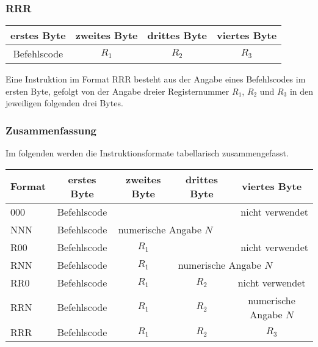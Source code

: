 \subsubsection{RRR}
\label{RRR}

\begin{center}
  \begin{tabular}{|*{4}{c|}} \hline
    erstes Byte & zweites Byte  & drittes Byte  & viertes Byte \\\hline\hline
    Befehlscode & $R_{1}$       & $R_{2}$       & $R_{3}$      \\\hline
  \end{tabular}
\end{center}

Eine Instruktion im Format RRR besteht aus der Angabe eines Befehlscodes im
ersten Byte, gefolgt von der Angabe dreier Registernummer $R_{1}$, $R_{2}$ und
$R_{3}$ in den jeweiligen folgenden drei Bytes.


\subsubsection{Zusammenfassung}
\label{subsec:Instr-Formate-Zusammenfassung}
Im folgenden werden die Instruktionsformate tabellarisch zusammengefasst.

\begin{center}
  \begin{tabular}{|l||*{4}{c|}}
    \hline
    Format & erstes Byte & zweites Byte  & drittes Byte  & viertes Byte
    \\\hline\hline
    000 & Befehlscode & \multicolumn{3}{r|}{nicht verwendet}               
\\\hline
    NNN & Befehlscode & \multicolumn{3}{l|}{numerische Angabe $N$}          
\\\hline
    R00 & Befehlscode & $R_{1}$ & \multicolumn{2}{r|}{nicht verwendet}      
\\\hline
    RNN & Befehlscode & $R_{1}$ & \multicolumn{2}{l|}{numerische Angabe $N$}
\\\hline
    RR0 & Befehlscode & $R_{1}$ & $R_{2}$ &  nicht verwendet                
\\\hline
    RRN & Befehlscode & $R_{1}$ & $R_{2}$ & numerische Angabe $N$           
\\\hline
    RRR & Befehlscode & $R_{1}$ & $R_{2}$ & $R_{3}$                         
\\\hline
  \end{tabular}
\end{center}



